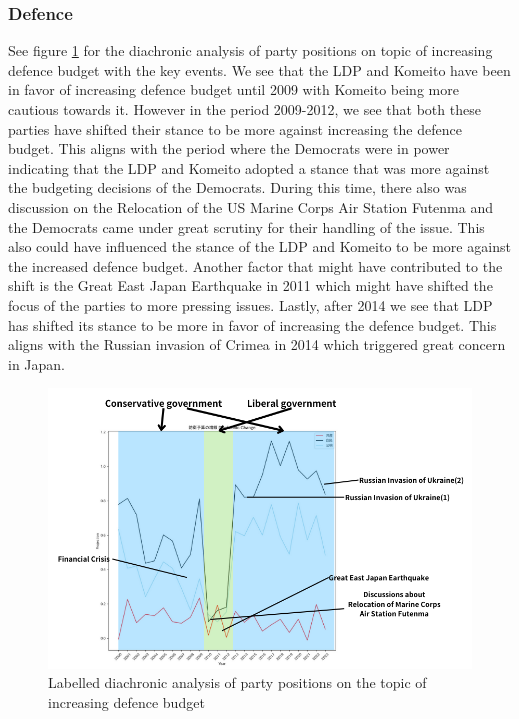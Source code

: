 \documentclass[final,5p,times,twocolumn,authoryear]{elsarticle}
\begin{document}
\subsubsection{Defence}
See figure \ref{fig:diachronic-defence} for the diachronic analysis of party positions on topic of increasing defence budget with the key events. We see that the LDP and Komeito have been in favor of increasing defence budget until 2009 with Komeito being more cautious towards it. However in the period 2009-2012, we see that both these parties have shifted their stance to be more against increasing the defence budget. This aligns with the period where the Democrats were in power indicating that the LDP and Komeito adopted a stance that was more against the budgeting decisions of the Democrats. During this time, there also was discussion on the Relocation of the US Marine Corps Air Station Futenma and the Democrats came under great scrutiny for their handling of the issue. This also could have influenced the stance of the LDP and Komeito to be more against the increased defence budget. Another factor that might have contributed to the shift is the Great East Japan Earthquake in 2011 which might have shifted the focus of the parties to more pressing issues. Lastly, after 2014 we see that LDP has shifted its stance to be more in favor of increasing the defence budget. This aligns with the Russian invasion of Crimea in 2014 which triggered great concern in Japan. 
\begin{figure}
	\centering
	\includegraphics[width=\linewidth]{figs/defence diachronic.png}
	\caption{Labelled diachronic analysis of party positions on the topic of increasing defence budget}
	\label{fig:diachronic-defence}
\end{figure}
\end{document}
